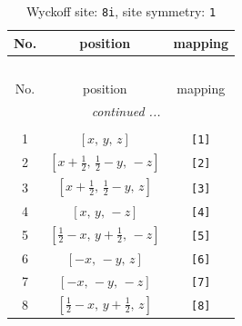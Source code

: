\documentclass[fleqn,8pt]{jsarticle}
\begin{document}
\renewcommand{\arraystretch}{1.2}
\begin{longtable}{ccc}
\caption{Wyckoff site: {\tt 8i}, site symmetry: {\tt 1}}
 \\
 \hline \hline
No. & position & mapping \\ \hline \endfirsthead

\multicolumn{2}{l}{\tablename\ \thetable{}} \\
 \hline \hline
No. & position & mapping \\ \hline \endhead

 \hline \hline
\multicolumn{2}{r}{\footnotesize\it continued ...} \\ \endfoot

 \hline \hline
\multicolumn{2}{r}{} \\ \endlastfoot

1 & $\left[ x,\, y,\, z \right]$ & {\tt [1]} \\ \hline
2 & $\left[ x + \frac{1}{2},\, \frac{1}{2} - y,\, - z \right]$ & {\tt [2]} \\ \hline
3 & $\left[ x + \frac{1}{2},\, \frac{1}{2} - y,\, z \right]$ & {\tt [3]} \\ \hline
4 & $\left[ x,\, y,\, - z \right]$ & {\tt [4]} \\ \hline
5 & $\left[ \frac{1}{2} - x,\, y + \frac{1}{2},\, - z \right]$ & {\tt [5]} \\ \hline
6 & $\left[ - x,\, - y,\, z \right]$ & {\tt [6]} \\ \hline
7 & $\left[ - x,\, - y,\, - z \right]$ & {\tt [7]} \\ \hline
8 & $\left[ \frac{1}{2} - x,\, y + \frac{1}{2},\, z \right]$ & {\tt [8]} \\
\end{longtable}
\end{document}
